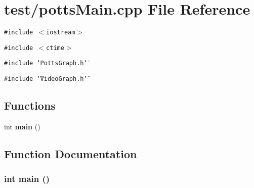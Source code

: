 \section{test/pottsMain.cpp File Reference}
\label{pottsMain_8cpp}
{\tt \#include $<$iostream$>$}\par
{\tt \#include $<$ctime$>$}\par
{\tt \#include \char`\"{}PottsGraph.h\char`\"{}}\par
{\tt \#include \char`\"{}VideoGraph.h\char`\"{}}\par
\subsection*{Functions}
\begin{CompactItemize}
\item 
int {\bf main} ()
\end{CompactItemize}


\subsection{Function Documentation}
\subsubsection{\setlength{\rightskip}{0pt plus 5cm}int main ()}\label{pottsMain_8cpp_446c6b9a1a4dbab517fbb760870458a3}



